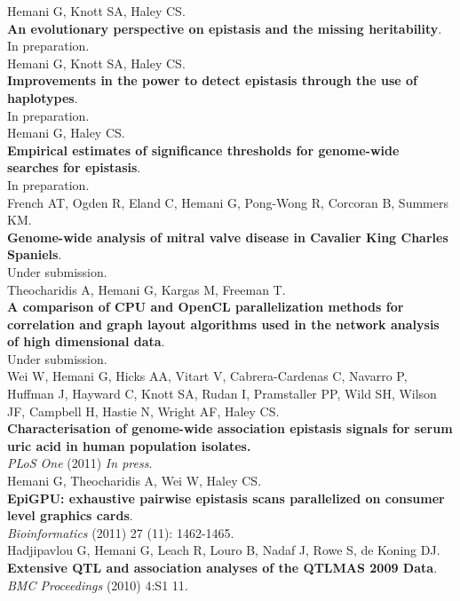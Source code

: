 \documentclass[a4paper, 11pt, oneside]{Thesis}
\begin{document}
\clearpage



\listofpublications
{
Hemani G, Knott SA, Haley CS.\\
\textbf{An evolutionary perspective on epistasis and the missing heritability}.\\
In preparation. \\[.3cm]
Hemani G, Knott SA, Haley CS.\\
\textbf{Improvements in the power to detect epistasis through the use of haplotypes}.\\
In preparation. \\[.3cm]
Hemani G, Haley CS.\\
\textbf{Empirical estimates of significance thresholds for genome-wide searches for epistasis}.\\
In preparation. \\[.3cm]
French AT, Ogden R, Eland C, Hemani G, Pong-Wong R, Corcoran B, Summers KM.\\
\textbf{Genome-wide analysis of mitral valve disease in Cavalier King Charles Spaniels}.\\
Under submission. \\[.3cm]
Theocharidis A, Hemani G, Kargas M, Freeman T.\\
\textbf{A comparison of CPU and OpenCL parallelization methods for correlation and graph layout algorithms used in the network analysis of high dimensional data}.\\
Under submission. \\[.3cm]
Wei W, Hemani G, Hicks AA, Vitart V, Cabrera-Cardenas C, Navarro P, Huffman J, Hayward C, Knott SA, Rudan I, Pramstaller PP, Wild SH, Wilson JF, Campbell H, Hastie N, Wright AF, Haley CS.\\
\textbf{Characterisation of genome-wide association epistasis signals for serum uric acid in human population isolates.} \\
\emph{PLoS One} (2011) \emph{In press}. \\[.3cm]
Hemani G, Theocharidis A, Wei W, Haley CS.\\
\textbf{EpiGPU: exhaustive pairwise epistasis scans parallelized on consumer level graphics cards}.\\
\emph{Bioinformatics} (2011) 27 (11): 1462-1465. \\[.3cm]
Hadjipavlou G, Hemani G, Leach R, Louro B, Nadaf J, Rowe S, de Koning DJ.\\
\textbf{Extensive QTL and association analyses of the QTLMAS 2009 Data}.\\
\emph{BMC Proceedings} (2010) 4:S1 11. \\[.3cm]
}
\end{document}
